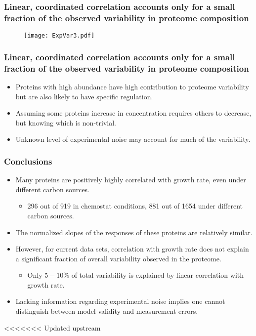 \documentclass{beamer}
\begin{document}
\begin{frame}
\frametitle{Linear, coordinated correlation accounts only for a small fraction of the observed variability in proteome composition}
\begin{figure}[h!]
\centering
\texttt{[image: ExpVar3.pdf]}
\end{figure}
\end{frame}

\begin{frame}
\frametitle{Linear, coordinated correlation accounts only for a small fraction of the observed variability in proteome composition}
\begin{itemize}[<+->]
\item Proteins with high abundance have high contribution to proteome variability but are also likely to have specific regulation.
\item Assuming some proteins increase in concentration requires others to decrease, but knowing which is non-trivial.
\item Unknown level of experimental noise may account for much of the variability.
\end{itemize}
\end{frame}

\begin{frame}
\frametitle{Conclusions}
\begin{itemize}
\item Many proteins are positively highly correlated with growth rate, even under different carbon sources.
\begin{itemize}
\item 296 out of 919 in chemostat conditions, 881 out of 1654 under different carbon sources.
\end{itemize}
\item The normalized slopes of the responses of these proteins are relatively similar.
\item However, for current data sets, correlation with growth rate does not explain a significant fraction of overall variability observed in the proteome.
\begin{itemize}
\item Only $5-10\%$ of total variability is explained by linear correlation with growth rate.
\end{itemize}
\item Lacking information regarding experimental noise implies one cannot distinguish between model validity and measurement errors.
\end{itemize}
\end{frame}
<<<<<<< Updated upstream
\end{document}

